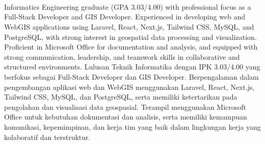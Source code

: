 
\begin{center}
    {\Large \textbf{\FullName}}\\
    \Location \\[6pt]

    \Phone \;\textbar\;
    \href{mailto:\Email}{\Email} \;\textbar\;
    \href{\LinkedInURL}{\LinkedInText} \\
    
    \href{\GitHubURL}{\GitHubText} \;\textbar\;
    \href{\InstagramURL}{\InstagramText} \;\textbar\;
    \href{\WebsiteURL}{\WebsiteText}
\end{center}

\ifenglish
Informatics Engineering graduate (GPA 3.03/4.00) with professional focus as a Full-Stack Developer and GIS Developer. Experienced in developing web and WebGIS applications using Laravel, React, Next.js, Tailwind CSS, MySQL, and PostgreSQL, with strong interest in geospatial data processing and visualization. Proficient in Microsoft Office for documentation and analysis, and equipped with strong communication, leadership, and teamwork skills in collaborative and structured environments.
\else
Lulusan Teknik Informatika dengan IPK 3.03/4.00 yang berfokus sebagai Full-Stack Developer dan GIS Developer. Berpengalaman dalam pengembangan aplikasi web dan WebGIS menggunakan Laravel, React, Next.js, Tailwind CSS, MySQL, dan PostgreSQL, serta memiliki ketertarikan pada pengolahan dan visualisasi data geospasial. Terampil menggunakan Microsoft Office untuk kebutuhan dokumentasi dan analisis, serta memiliki kemampuan komunikasi, kepemimpinan, dan kerja tim yang baik dalam lingkungan kerja yang kolaboratif dan terstruktur.
\fi